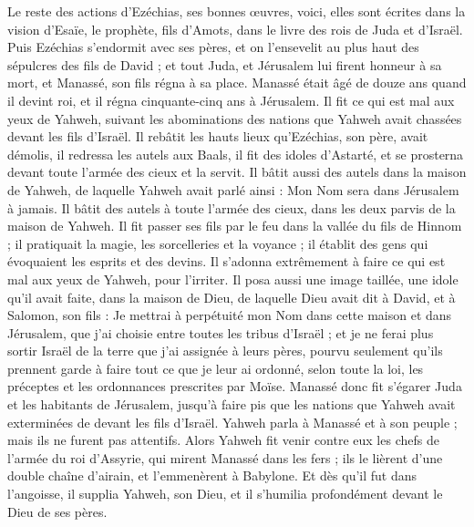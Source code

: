 \begin{multicols}{2}
Le reste des actions d'Ezéchias, ses bonnes œuvres, voici, elles sont écrites dans la vision d'Esaïe, le prophète, fils d'Amots, dans le livre des rois de Juda et d'Israël.
Puis Ezéchias s'endormit avec ses pères, et on l'ensevelit au plus haut des sépulcres des fils de David ; et tout Juda, et Jérusalem lui firent honneur à sa mort, et Manassé, son fils régna à sa place.
\VerseOne{}Manassé était âgé de douze ans quand il devint roi, et il régna cinquante-cinq ans à Jérusalem.
Il fit ce qui est mal aux yeux de Yahweh, suivant les abominations des nations que Yahweh avait chassées devant les fils d’Israël.
Il rebâtit les hauts lieux qu'Ezéchias, son père, avait démolis, il redressa les autels aux Baals, il fit des idoles d'Astarté, et se prosterna devant toute l'armée des cieux et la servit.
Il bâtit aussi des autels dans la maison de Yahweh, de laquelle Yahweh avait parlé ainsi : Mon Nom sera dans Jérusalem à jamais.
Il bâtit des autels à toute l'armée des cieux, dans les deux parvis de la maison de Yahweh.
Il fit passer ses fils par le feu dans la vallée du fils de Hinnom ; il pratiquait la magie, les sorcelleries et la voyance ; il établit des gens qui évoquaient les esprits et des devins. Il s'adonna extrêmement à faire ce qui est mal aux yeux de Yahweh, pour l'irriter.
Il posa aussi une image taillée, une idole qu'il avait faite, dans la maison de Dieu, de laquelle Dieu avait dit à David, et à Salomon, son fils : Je mettrai à perpétuité mon Nom dans cette maison et dans Jérusalem, que j'ai choisie entre toutes les tribus d'Israël ;
et je ne ferai plus sortir Israël de la terre que j'ai assignée à leurs pères, pourvu seulement qu'ils prennent garde à faire tout ce que je leur ai ordonné, selon toute la loi, les préceptes et les ordonnances prescrites par Moïse.
Manassé donc fit s’égarer Juda et les habitants de Jérusalem, jusqu'à faire pis que les nations que Yahweh avait exterminées de devant les fils d’Israël.
Yahweh parla à Manassé et à son peuple ; mais ils ne furent pas attentifs.
Alors Yahweh fit venir contre eux les chefs de l'armée du roi d’Assyrie, qui mirent Manassé dans les fers ; ils le lièrent d'une double chaîne d'airain, et l'emmenèrent à Babylone.
Et dès qu'il fut dans l’angoisse, il supplia Yahweh, son Dieu, et il s'humilia profondément devant le Dieu de ses pères.

\end{multicols}
